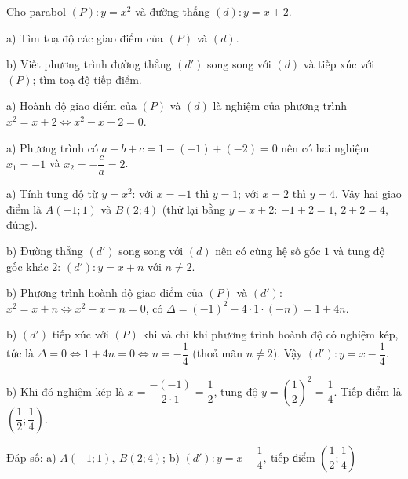 \begin{problem}[9DS-HSB2-005]
Cho parabol $(P)\colon y = x^2$ và đường thẳng $(d)\colon y = x + 2$.

a) Tìm toạ độ các giao điểm của $(P)$ và $(d)$.

b) Viết phương trình đường thẳng $(d')$ song song với $(d)$ và tiếp xúc với $(P)$; tìm toạ độ tiếp điểm.

\begin{solution}
a) Hoành độ giao điểm của $(P)$ và $(d)$ là nghiệm của phương trình $x^2 = x + 2 \Leftrightarrow x^2 - x - 2 = 0$.

a) Phương trình có $a - b + c = 1 - (-1) + (-2) = 0$ nên có hai nghiệm $x_1 = -1$ và $x_2 = -\dfrac{c}{a} = 2$.

a) Tính tung độ từ $y = x^2$: với $x = -1$ thì $y = 1$; với $x = 2$ thì $y = 4$. Vậy hai giao điểm là $A(-1; 1)$ và $B(2; 4)$ (thử lại bằng $y = x + 2$: $-1 + 2 = 1$, $2 + 2 = 4$, đúng).

b) Đường thẳng $(d')$ song song với $(d)$ nên có cùng hệ số góc $1$ và tung độ gốc khác $2$: $(d')\colon y = x + n$ với $n \neq 2$.

b) Phương trình hoành độ giao điểm của $(P)$ và $(d')$: $x^2 = x + n \Leftrightarrow x^2 - x - n = 0$, có $\Delta = (-1)^2 - 4 \cdot 1 \cdot (-n) = 1 + 4n$.

b) $(d')$ tiếp xúc với $(P)$ khi và chỉ khi phương trình hoành độ có nghiệm kép, tức là $\Delta = 0 \Leftrightarrow 1 + 4n = 0 \Leftrightarrow n = -\dfrac{1}{4}$ (thoả mãn $n \neq 2$). Vậy $(d')\colon y = x - \dfrac{1}{4}$.

b) Khi đó nghiệm kép là $x = \dfrac{-(-1)}{2 \cdot 1} = \dfrac{1}{2}$, tung độ $y = \left(\dfrac{1}{2}\right)^2 = \dfrac{1}{4}$. Tiếp điểm là $\left(\dfrac{1}{2}; \dfrac{1}{4}\right)$.

Đáp số: a) $\boxed{A(-1; 1),\ B(2; 4)}$; b) $\boxed{(d')\colon y = x - \dfrac{1}{4},\ \text{tiếp điểm } \left(\dfrac{1}{2}; \dfrac{1}{4}\right)}$
\end{solution}
\end{problem}


